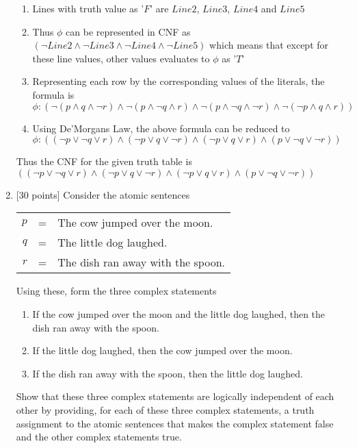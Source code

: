 \documentclass{article}
\begin{document}
\begin{enumerate}
    \begin{answer}
  	\begin{enumerate}
  		\item Lines with truth value as '$F$' are $Line2$, $Line3$, $Line4$ and $Line5$
  		\item Thus $\phi$ can be represented in CNF as $(\neg Line2 \land
  		\neg Line3 \land \neg Line4 \land \neg Line5)$ which means that except for these line values, other values evaluates to $\phi$ as '$T$' 
  		\item Representing each row by the corresponding values of the
  		literals, the formula is $\phi : (\neg (p \land q \land \neg r)
  		\land \neg(p \land \neg q \land r) \land \neg( p \land \neg q \land
  		\neg r) \land \neg(\neg p \land q \land r))$
  		\item Using De'Morgans Law, the above formula can be reduced to $\phi: ((\neg
  		p \lor \neg q \lor r) \land (\neg p \lor q \lor \neg r) \land (\neg p \lor q
  		\lor r) \land (p \lor \neg q \lor \neg r))$
  	\end{enumerate}
  	
  	Thus the CNF for the given truth table is $((\neg
  		p \lor \neg q \lor r) \land (\neg p \lor q \lor \neg r) \land (\neg p \lor q
  		\lor r) \land (p \lor \neg q \lor \neg r))$
  \end{answer}
  
\item {[30 points]} Consider the atomic sentences
  \begin{center}
    \begin{tabular}{rcl}
      $p$ &=& The cow jumped over the moon. \\
      $q$ &=& The little dog laughed. \\
      $r$ &=& The dish ran away with the spoon. \\
    \end{tabular}
  \end{center}
  Using these, form the three complex statements
  \begin{enumerate}
  \item If the cow jumped over the moon and the little dog laughed,
    then the dish ran away with the spoon.
  \item If the little dog laughed, then the cow jumped over the moon.
  \item If the dish ran away with the spoon, then the little dog
    laughed.
  \end{enumerate}
  Show that these three complex statements are logically independent
  of each other by providing, for each of these three complex
  statements, a truth assignment to the atomic sentences that makes
  the complex statement false and the other complex statements true.
  

\end{enumerate}
\end{document}
